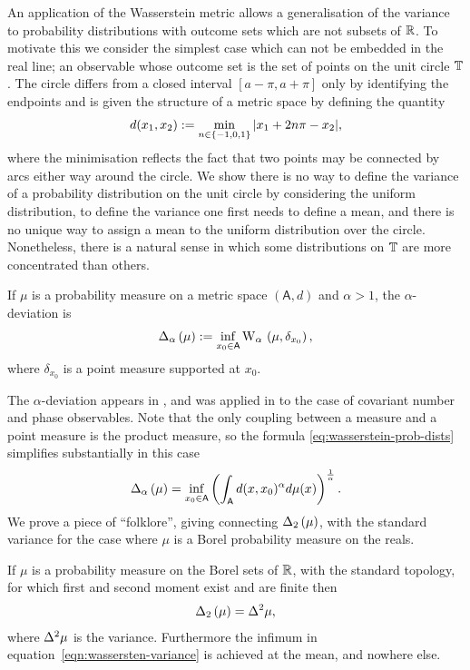 An application of the Wasserstein metric allows a generalisation of the variance to probability distributions with outcome sets which are not subsets of $\mathbb{R}$. To motivate this we consider the simplest case which can not be embedded in the real line; an observable whose outcome set is the set of points on the unit circle $\mathbb{T}$. The circle differs from a closed interval $[a-\pi, a+\pi]$ only by identifying the endpoints and is given the structure of a metric space by defining the quantity
\begin{align}
  d(x_1,x_2) := \min_{n\in \{-1,0,1\}} {\left\lvert{x_1 + 2n\pi - x_2}\right\rvert},
\end{align}
where the minimisation reflects the fact that two points may be connected by arcs either way around the circle. We show there is no way to define the variance of a probability distribution on the unit circle by considering the uniform distribution, to define the variance one first needs to define a mean, and there is no unique way to assign a mean to the uniform distribution over the circle. Nonetheless, there is a natural sense in which some distributions on $\mathbb{T}$ are more concentrated than others. 
\begin{defn}\label{defn:wasserstein-a-deviation}
  If $\mu$ is a probability measure on a metric space $(\mathsf{A}, d)$ and $\alpha > 1$, the $\alpha$-deviation is
\begin{align}
  \wsDev{\mu}[\alpha] \defeq \inf_{x_0\in\mathsf{A}} \ws{\mu, \delta_{x_0}}[\alpha], \label{eqn:wassersten-variance}
\end{align}
where $\delta_{x_0}$ is a point measure supported at $x_0$.
\end{defn}
 The $\alpha$-deviation appears in \cite{blw-meas-uncertainty}, and was applied in \cite{sharp-ur-num-angle} to the case of covariant number and phase observables. Note that the only coupling between a measure and a point measure is the product measure, so the formula \eqref{eq:wasserstein-prob-dists} simplifies substantially in this case
\begin{align}
  \wsDev{\mu}[\alpha] = \inf_{x_0\in\mathsf{A}} \left(\int_{\mathsf{A}} d(x,x_0)^\alpha d\mu(x)\right)^\frac{1}{\alpha}.
\end{align}
We prove a piece of ``folklore'', giving connecting $\wsDev{\mu}[2]$, with the standard variance for the case where $\mu$ is a Borel probability measure on the reals. 
\begin{lem}\label{lem:prelims-wasserstein-var-equals-var}
  If $\mu$ is a probability measure on the Borel sets of $\mathbb{R}$, with the standard topology, for which first and second moment exist and are finite then 
  \begin{align}
    \wsDev{\mu}[2] = \var{\mu},
  \end{align}
  where $\var{\mu}$ is the variance. Furthermore the infimum in equation~\eqref{eqn:wassersten-variance} is achieved at the mean, and nowhere else.
\end{lem}
